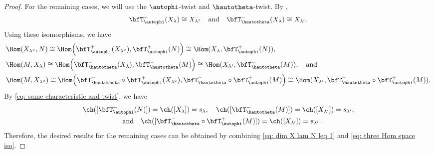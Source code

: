 \documentclass[12pt, reqno]{amsart}
\theoremstyle{plain}
\theoremstyle{definition}
\numberwithin{equation}{section}
\numberwithin{figure}{section}
\numberwithin{table}{section}
\begin{document}
\begin{proof}
For the remaining cases, we will use  the $\autophi$-twist and $\hautotheta$-twist.
By
\cite[Proposition A.2(3)]{23KLO},
\begin{align*}
\bfT_{\autophi}^+(X_{\lambda})\cong X_{\lambda^\circ}
\quad\text{and}\quad
\bfT_{\hautotheta}^-(X_{\lambda})\cong X_{\lambda'}.
\end{align*}
Using these isomorphisms, we have
\begin{equation}\label{eq: three Hom space iso}
\begin{aligned}
& \Hom(X_{\lambda^\circ}, N)
\cong \Hom\Bigl(\bfT^{+}_{\autophi}( X_{\lambda^\circ}), \bfT^{+}_{\autophi}(N)\Bigr)
\cong \Hom(X_{\lambda}, \bfT^{+}_{\autophi}(N)), \\
& \Hom(M,  X_{\lambda})  
\cong \Hom\Bigl(\bfT^{-}_{\hautotheta}(X_{\lambda}), \bfT^{-}_{\hautotheta}(M)\Bigr) 
\cong \Hom(X_{\lambda'}, \bfT^{-}_{\hautotheta}(M)), \quad \text{and} \\
& \Hom(M,  X_{\lambda^\circ}) 
\cong
\Hom\Bigl(
\bfT_{\hautotheta}^-\circ \bfT^{+}_{\autophi}(X_{\lambda^\circ}), \bfT_{\hautotheta}^- \circ \bfT^{+}_{\autophi}(M) \Bigr)
\cong \Hom(X_{\lambda'}, \bfT_{\hautotheta}^- \circ \bfT^{+}_{\autophi}(M)).
\end{aligned}
\end{equation}
By \cref{eq: same characteristic and twist}, we have 
\begin{equation*}
\begin{array}{c}
\ch([\bfT^{+}_{\autophi}(N)]) = \ch([X_{\lambda}]) = s_{\lambda}, \quad
\ch([\bfT^{-}_{\hautotheta}(M)]) = \ch([X_{\lambda'}]) = s_{\lambda'}, \\[1ex]\quad\text{and}\quad\ch([\bfT^{-}_{\hautotheta} \circ \bfT^{+}_{\autophi}(M)]) = \ch([X_{\lambda'}]) = s_{\lambda'}.
\end{array}
\end{equation*}
Therefore, the desired results for the remaining cases can be obtained by combining \cref{eq: dim X lam N leq 1} and \cref{eq: three Hom space iso}.
\end{proof}
\end{document}
